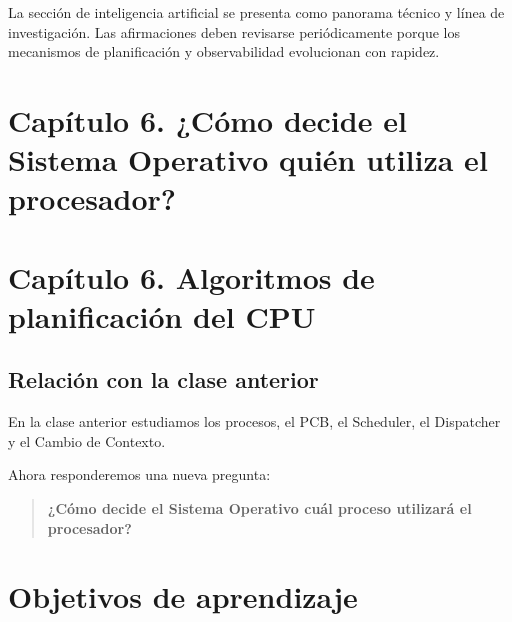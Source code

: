 \documentclass[
  spanish,
  letterpaper,
]{scrbook}
\begin{document}
\begin{tcolorbox}[enhanced jigsaw, arc=.35mm, bottomrule=.15mm, bottomtitle=1mm, breakable, colback=white, colbacktitle=quarto-callout-note-color!10!white, colframe=quarto-callout-note-color-frame, coltitle=black, left=2mm, leftrule=.75mm, opacityback=0, opacitybacktitle=0.6, rightrule=.15mm, title=\textcolor{quarto-callout-note-color}{\faInfo}\hspace{0.5em}{Nota editorial}, titlerule=0mm, toprule=.15mm, toptitle=1mm]

La sección de inteligencia artificial se presenta como panorama técnico
y línea de investigación. Las afirmaciones deben revisarse
periódicamente porque los mecanismos de planificación y observabilidad
evolucionan con rapidez.

\end{tcolorbox}


\chapter{Capítulo 6. ¿Cómo decide el Sistema Operativo quién utiliza el
procesador?}\label{capuxedtulo-6.-cuxf3mo-decide-el-sistema-operativo-quiuxe9n-utiliza-el-procesador}


\chapter{Capítulo 6. Algoritmos de planificación del
CPU}\label{capuxedtulo-6.-algoritmos-de-planificaciuxf3n-del-cpu}

\section{Relación con la clase
anterior}\label{relaciuxf3n-con-la-clase-anterior}

En la clase anterior estudiamos los procesos, el PCB, el Scheduler, el
Dispatcher y el Cambio de Contexto.

Ahora responderemos una nueva pregunta:

\begin{quote}
\textbf{¿Cómo decide el Sistema Operativo cuál proceso utilizará el
procesador?}
\end{quote}


\chapter{Objetivos de aprendizaje}\label{objetivos-de-aprendizaje-4}
\end{document}
